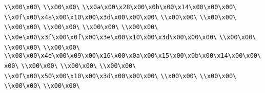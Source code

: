 \verb|\\x00\x00\|\newline
\verb|\\x00\x00\|\newline
\verb|\\x0a\x00\x28\x00\x0b\x00\x14\x00\x00\x00\|\newline
\verb|\\x0f\x00\x4a\x00\x10\x00\x3d\x00\x00\x00\|\newline
\verb|\\x00\x00\|\newline
\verb|\\x00\x00\|\newline
\verb|\\x00\x00\|\newline
\verb|\\x00\x00\|\newline
\verb|\\x00\x00\|\newline
\verb|\\x00\x00\|\newline
\verb|\\x0e\x00\x3f\x00\x0f\x00\x3e\x00\x10\x00\x3d\x00\x00\x00\|\newline
\verb|\\x00\x00\|\newline
\verb|\\x00\x00\|\newline
\verb|\\x00\x00\|\newline
\verb|\\x08\x00\x4e\x00\x09\x00\x16\x00\x0a\x00\x15\x00\x0b\x00\x14\x00\x00\x00\|\newline
\verb|\\x00\x00\|\newline
\verb|\\x00\x00\|\newline
\verb|\\x00\x00\|\newline
\verb|\\x0f\x00\x50\x00\x10\x00\x3d\x00\x00\x00\|\newline
\verb|\\x00\x00\|\newline
\verb|\\x00\x00\|\newline
\verb|\\x00\x00\|\newline
\verb|\\x00\x00\|\newline
